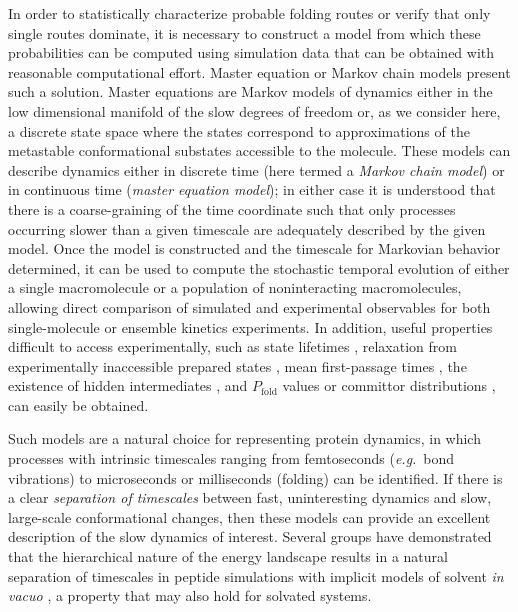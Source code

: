In order to statistically characterize probable folding routes or verify that only single routes dominate, it is necessary to construct a model from which these probabilities can be computed using simulation data that can be obtained with reasonable computational effort.  
Master equation or Markov chain models \cite{vankampen,swope:2004a,singhal:2004a,chodera:mms:2006} present such a solution.
Master equations are Markov models of dynamics either in the low dimensional manifold of the slow degrees of freedom or, as we consider here, a discrete state space where the states correspond to approximations of the metastable conformational substates accessible to the molecule.  
These models can describe dynamics either in discrete time (here termed a \emph{Markov chain model}) or in continuous time (\emph{master equation model}); in either case it is understood that there is a coarse-graining of the time coordinate such that only processes occurring slower than a given timescale are adequately described by the given model.
Once the model is constructed and the timescale for Markovian behavior determined, it can be used to compute the stochastic temporal evolution of either a single macromolecule or a population of noninteracting macromolecules, allowing direct comparison of simulated and experimental observables for both single-molecule or ensemble kinetics experiments.
In addition, useful properties difficult to access experimentally, such as state lifetimes \cite{swope:2004a}, relaxation from experimentally inaccessible prepared states \cite{chodera:mms:2006}, mean first-passage times \cite{singhal:2004a}, the existence of hidden intermediates \cite{ozkan:2002a}, and $P_\mathrm{fold}$ values \cite{lenz:2004a} or committor distributions \cite{geissler:jpcb:1999}, can easily be obtained.

Such models are a natural choice for representing protein dynamics, in which processes with intrinsic timescales ranging from femtoseconds (\emph{e.g.}\ bond vibrations) to microseconds or milliseconds (folding) can be identified. 
If there is a clear \emph{separation of timescales} between fast, uninteresting dynamics and slow, large-scale conformational changes, then these models can provide an excellent description of the slow dynamics of interest.
Several groups have demonstrated that the hierarchical nature of the energy landscape results in a natural separation of timescales in peptide simulations with implicit models of solvent \emph{in vacuo} \cite{levy:2001a, mortenson:2001a}, a property that may also hold for solvated systems.

